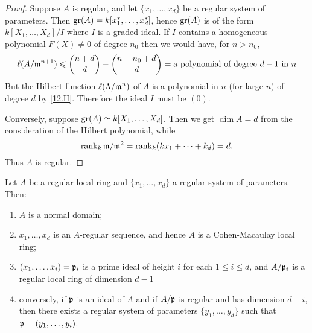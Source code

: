 \documentclass[../main]{subfiles}
\begin{document}
\begin{proof}
  Suppose $A$ is regular, and let $\{x_1, \dots, x_d\}$ be a regular system of parameters. Then $\operatorname{gr}(A) = k[x_1^\ast,\dots,x_d^\ast]$, hence $\operatorname{gr}(A)$ is of the form $k[X_1, \ldots, X_d] / I$ where $I$ is a graded ideal. If $I$ contains a homogeneous polynomial $F(X) \neq 0$ of degree $n_0$ then we would have, for $n>n_0$,
  \[\ell(A/\mathfrak{m}^{n+1}) \leqslant \binom{n+d}d -\binom{n-n_0+d}d = \text{a polynomial of degree }d-1\text{ in }n\]
  But the Hilbert function $\ell(\Lambda/\mathfrak{m}^n)$ of $A$ is a polynomial in $n$ (for large $n$) of degree $d$ by \ref{12.H}. Therefore the ideal $I$ must be $(0)$.
  
  Conversely, suppose $\operatorname{gr}(A) \simeq k[X_1, \dots, X_d]$. Then we get $\dim A=d$ from the consideration of the Hilbert polynomial, while \[\operatorname{rank}_k \mathfrak{m} / \mathfrak{m}^2=\operatorname{rank}_k(k x_1+\dots+k_d)=d.\] Thus $A$ is regular.
\end{proof}

\begin{partheorem}\label{thm:036}
  Let $A$ be a regular local ring and $\{x_1, \ldots, x_d\}$ a regular system of parameters. Then:
  \begin{enumerate}[label=(\arabic*)]
  \item $A$ is a normal domain;

  \item $x_1, \ldots, x_d$ is an $A$-regular sequence, and hence $A$ is a Cohen-Macaulay local ring;

  \item $(x_1, \dots, x_i)=\mathfrak{p}_i$ is a prime ideal of height $i$ for each $1 \leqslant i \leqslant d$, and $A /\mathfrak{p}_i$ is a regular local ring of dimension $d-1$

  \item conversely, if $\mathfrak{p}$ is an ideal of $A$ and if $A / \mathfrak{p}$ is regular and has dimension $d-i$, then there exists a regular system of parameters $\{y_1, \ldots, y_d\}$ such that $\mathfrak{p}=(y_1, \dots, y_i)$.

\end{enumerate}
\end{partheorem}
\end{document}
